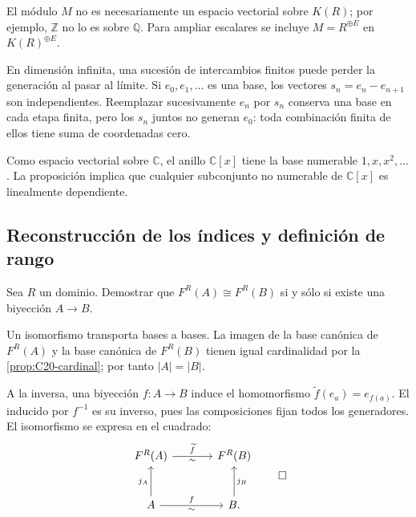 \begin{obs}
El módulo $M$ no es necesariamente un espacio vectorial sobre $K(R)$; por ejemplo, $\mathbb Z$ no lo es sobre $\mathbb Q$. Para ampliar escalares se incluye $M=R^{\oplus E}$ en $K(R)^{\oplus E}$.

En dimensión infinita, una sucesión de intercambios finitos puede perder la generación al pasar al límite. Si $e_0,e_1,\ldots$ es una base, los vectores $s_n=e_n-e_{n+1}$ son independientes. Reemplazar sucesivamente $e_n$ por $s_n$ conserva una base en cada etapa finita, pero los $s_n$ juntos no generan $e_0$: toda combinación finita de ellos tiene suma de coordenadas cero.
\end{obs}

\begin{ejem}
Como espacio vectorial sobre $\mathbb C$, el anillo $\mathbb C[x]$ tiene la base numerable $1,x,x^2,\ldots$. La proposición implica que cualquier subconjunto no numerable de $\mathbb C[x]$ es linealmente dependiente.
\end{ejem}

\subsection{Reconstrucción de los índices y definición de rango}\label{tema:20-2-2}
\begin{ejer}\label{ejer:C20-indices}
Sea $R$ un dominio. Demostrar que $F^R(A)\cong F^R(B)$ si y sólo si existe una biyección $A\to B$.
\end{ejer}
\begin{sol}
Un isomorfismo transporta bases a bases. La imagen de la base canónica de $F^R(A)$ y la base canónica de $F^R(B)$ tienen igual cardinalidad por la \cref{prop:C20-cardinal}; por tanto $|A|=|B|$.

A la inversa, una biyección $f:A\to B$ induce el homomorfismo $\widetilde f(e_a)=e_{f(a)}$. El inducido por $f^{-1}$ es su inverso, pues las composiciones fijan todos los generadores. El isomorfismo se expresa en el cuadrado:
\[
\begin{tikzcd}[row sep=large,column sep=large]
F^R(A)\arrow[r,"\widetilde f","\sim"']&F^R(B)\\
A\arrow[u,"j_A"]\arrow[r,"f","\sim"']&B\arrow[u,"j_B"'].
\end{tikzcd}
\qedhere
\]
\end{sol}

